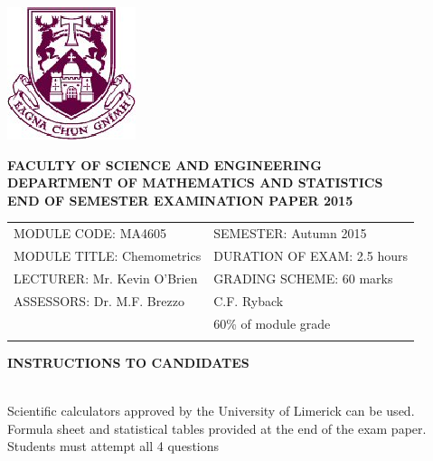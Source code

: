 \documentclass[a4paper,12pt]{article}
\begin{document}
\begin{center}
       \includegraphics[scale=0.55]{shieldtransparent2}
\end{center}

\begin{center}
\vspace{1cm}
\large \bf {FACULTY OF SCIENCE AND ENGINEERING} \\[0.5cm]
\normalsize DEPARTMENT OF MATHEMATICS AND STATISTICS \\[1.25cm]
\large \bf {END OF SEMESTER EXAMINATION PAPER 2015} \\[1.5cm]
\end{center}

\begin{tabular}{ll}
MODULE CODE: MA4605 & SEMESTER: Autumn 2015 \\[1cm]
MODULE TITLE: Chemometrics & DURATION OF EXAM: 2.5 hours \\[1cm]
LECTURER: Mr. Kevin O'Brien & GRADING SCHEME: 60 marks \\[1cm]
ASSESSORS: Dr. M.F. Brezzo & C.F. Ryback \\[1cm]
& \phantom{GRADING SCHEME:} \footnotesize {60\% of module grade} \\[0.8cm]
\\[1cm]
\end{tabular}
\begin{center}
{\bf INSTRUCTIONS TO CANDIDATES}
\end{center}

{\noindent \\ Scientific calculators approved by the University of Limerick can be used. \\
Formula sheet and statistical tables provided at the end of the exam paper.\\
Students must attempt all 4 questions}
\newpage



\newpage
\end{document}
